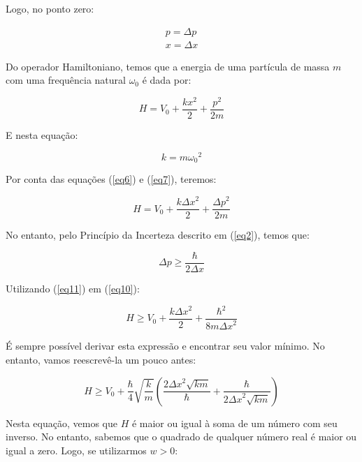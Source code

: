 Logo, no ponto zero:

\begin{eqnarray}
    p = \Delta p  \label{eq6} \\
    x = \Delta x  \label{eq7}
\end{eqnarray}

Do operador Hamiltoniano, temos que a energia de uma partícula de massa $m$ com uma frequência natural ${\omega}_0$ é dada por:

\begin{equation}
    H = V_0 + \frac{k x^2}{2} + \frac{p^2}{2m}
    \label{eq8}
\end{equation}

E nesta equação:

\begin{equation}
    k = m {{\omega}_0}^2
    \label{eq9}
\end{equation}

Por conta das equações (\ref{eq6}) e (\ref{eq7}), teremos:

\begin{equation}
    H = V_0 + \frac{k {\Delta x}^2}{2} + \frac{{\Delta p}^2}{2m}
    \label{eq10}
\end{equation}

No entanto, pelo Princípio da Incerteza descrito em (\ref{eq2}), temos que:

\begin{equation}
    \Delta p \geq \frac{\hbar}{2 \Delta x}
    \label{eq11}
\end{equation}

Utilizando (\ref{eq11}) em (\ref{eq10}):

\begin{equation}
    H \geq V_0 + \frac{k {\Delta x}^2}{2} + \frac{{\hbar}^2}{8m{\Delta x}^2}
    \label{eq12}
\end{equation}

É sempre possível derivar esta expressão e encontrar seu valor mínimo. No entanto, vamos reescrevê-la um pouco antes:

\begin{equation}
    H \geq V_0 + \frac{\hbar}{4}\sqrt{\frac{k}{m}} \left( \frac{2{\Delta x}^2 \sqrt{km}}{\hbar} + \frac{\hbar}{2{\Delta x}^2 \sqrt{km}} \right)
    \label{eq13}
\end{equation}

Nesta equação, vemos que $H$ é maior ou igual à soma de um número com seu inverso. No entanto, sabemos que o quadrado de qualquer número real é maior ou igual a zero. Logo, se utilizarmos $w > 0$:

